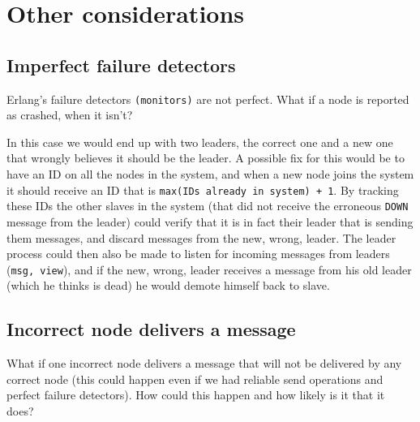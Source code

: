 \documentclass[a4paper, 11pt]{article}
\begin{document}
\section{Other considerations}

\subsection{Imperfect failure detectors}

Erlang's failure detectors \texttt{(monitors)} are not perfect. What if a node is reported as crashed, when it isn't?

In this case we would end up with two leaders, the correct one and a new one that wrongly believes it should be the leader. A possible fix for this would be to have an ID on all the nodes in the system, and when a new node joins the system it should receive an ID that is \texttt{max(IDs already in system) + 1}.
By tracking these IDs the other slaves in the system (that did not receive the erroneous \texttt{DOWN} message from the leader) could verify that it is in fact their leader that is sending them messages, and discard messages from the new, wrong, leader. The leader process could then also be made to listen for incoming messages from leaders (\texttt{msg, view}), and if the new, wrong, leader receives a message from his old leader (which he thinks is dead) he would demote himself back to slave.

\subsection{Incorrect node delivers a message}

What if one incorrect node delivers a message that will not be delivered by any correct node (this could happen even if we had reliable send operations and perfect failure detectors). How could this happen and how likely is it that it does?
\end{document}
